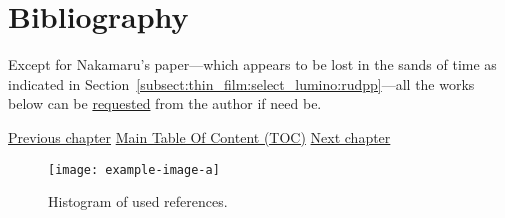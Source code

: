 \chapter{Bibliography}\label{chap:biblio}

\begin{tldrbox}
	Except for Nakamaru's paper\cite{nakamaru1979}---which appears to be lost in the sands of time as indicated in Section~\ref{subsect:thin_film:select_lumino:rudpp}---all the works below can be \href{mailto:emmanuel.dervieux@gmail.com}{requested} from the author if need be.
	
	\tcblower
	
	\hyperref[chap:conclusion]{Previous chapter} \hfill \hyperref[chapter:toc]{Main Table Of Content (TOC)} \hfill \hyperref[chap:add_ack]{Next chapter}
	
\end{tldrbox}

\begin{figure}
	\centering
	\texttt{[image: example-image-a]}
	\caption[Histogram of used references.]{Histogram of used references.}
	\label{fig:biblio:biblio_hist}
\end{figure}

\printbibliography[heading=none]